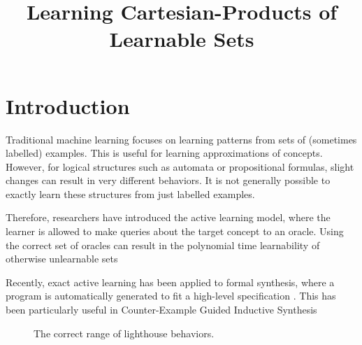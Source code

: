 

\title{Learning Cartesian-Products of Learnable Sets}
\author{}


\maketitle


\section{Introduction}
Traditional machine learning focuses on learning patterns from sets of (sometimes labelled) examples. 
This is useful for learning approximations of concepts. %
However, for logical structures such as automata or propositional formulas, slight changes can result in very different behaviors. 
It is not generally possible to exactly learn these structures from just labelled examples. 

Therefore, researchers have introduced the active learning model, where the learner is allowed to make queries about the target concept to an oracle. 
Using the correct set of oracles can result in the polynomial time learnability of otherwise unlearnable sets \cite{}

Recently, exact active learning has been applied to formal synthesis, where a program is automatically generated to fit a high-level specification \cite{}. 
This has been particularly useful in Counter-Example Guided Inductive Synthesis \cite{}





\begin{figure}
\caption{The correct range of lighthouse behaviors.}
\end{figure}



